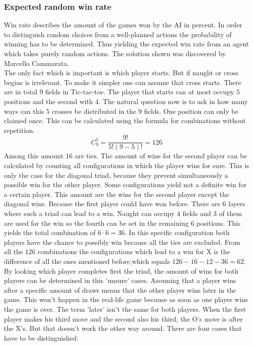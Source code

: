 \documentclass[12pt]{article}
\begin{document}
\subsubsection{Expected random win rate}
Win rate describes the amount of the games won by the \gls{AI} in percent.
In order to distinguish random choices from a well-planned actions the probability of winning has to be determined. Thus yielding the expected win rate from an agent which takes purely random actions.
The solution shown was discovered by Marcello Cammarata.  \cite{tic_tac_toe_prob} 
\\ The only fact which is important is which player starts. But if naught or cross begins is irrelevant. To make it simpler one can assume that cross starts. There are in total $9$ fields in Tic-tac-toe. The player that starts can at most occupy $5$ positions and the second with $4$. The natural question now is to ask in how many ways can this $5$ crosses be distributed in the 9 fields. One position can only be claimed once. This can be calculated using the formula for combinations without repetition.\cite{comb}
\begin{equation}\nonumber
    C^{5}_{9} = \frac{9!}{5!(9-5)!} = 126
\end{equation}
Among this amount $16$ are ties. The amount of wins for the second player can be calculated by counting all configurations in which the player wins for sure. This is only the case for the diagonal triad, because they prevent simultaneously a possible win for the other player. Some configurations yield not a definite win for a certain player. This amount are the wins for the second player except the diagonal wins. Because the first player could have won before. There are $6$ layers where such a triad can lead to a win. Naught can occupy $4$ fields and $3$ of them are used for the win so the fourth can be set in the remaining $6$ positions. This yields the total combination of $6 \cdot 6 = 36$. In this specific configuration both players have the chance to possibly win because all the ties are excluded.
From all the $126$ combinations the configurations which lead to a win for X is the difference of all the ones mentioned before,which equals $126 -  16 - 12 - 36 = 62 $.\\
By looking which player completes first the triad, the amount of wins for both players can be determined in this 'unsure' cases. Assuming that a player wins after a specific amount of draws means that the other player wins later in the game. This won't happen in the real-life game because as soon as one player wins the game is over. The term 'later' isn't the same for both players. When the first player makes his third move and the second also his third, the O's move is after the X's. But that doesn't work the other way around. There are four cases that have to be distinguished:
\end{document}
